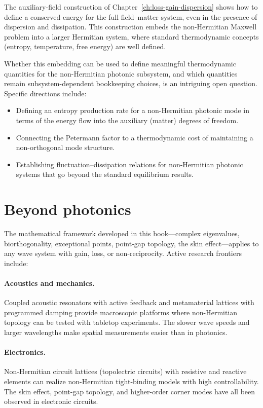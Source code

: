 The auxiliary-field construction of
Chapter~\ref{ch:loss-gain-dispersion} shows how to define a conserved
energy for the full field--matter system, even in the presence of
dispersion and dissipation. This construction embeds the non-Hermitian
Maxwell problem into a larger Hermitian system, where standard
thermodynamic concepts (entropy, temperature, free energy) are
well defined.

Whether this embedding can be used to define meaningful thermodynamic
quantities for the non-Hermitian photonic subsystem, and which
quantities remain subsystem-dependent bookkeeping choices, is an
intriguing open question. Specific directions
include:
\begin{itemize}
 \item Defining an entropy production rate for a non-Hermitian
 photonic mode in terms of the energy flow into the auxiliary
 (matter) degrees of freedom.
 \item Connecting the Petermann factor to a thermodynamic cost of
 maintaining a non-orthogonal mode structure.
 \item Establishing fluctuation--dissipation relations for
 non-Hermitian photonic systems that go beyond the standard
 equilibrium results.
\end{itemize}


\section{Beyond photonics}
\label{sec:beyond-photonics}

The mathematical framework developed in this book---complex eigenvalues,
biorthogonality, exceptional points, point-gap topology, the skin
effect---applies to any wave system with gain, loss, or non-reciprocity.
Active research frontiers include:

\paragraph{Acoustics and mechanics.}
Coupled acoustic resonators with active feedback and metamaterial
lattices with programmed damping provide macroscopic platforms where
non-Hermitian topology can be tested with tabletop experiments. The
slower wave speeds and larger wavelengths make spatial measurements
easier than in photonics.

\paragraph{Electronics.}
Non-Hermitian circuit lattices (topolectric circuits) with resistive
and reactive elements can realize non-Hermitian tight-binding models
with high controllability. The skin effect, point-gap topology, and
higher-order corner modes have all been observed in electronic circuits.

